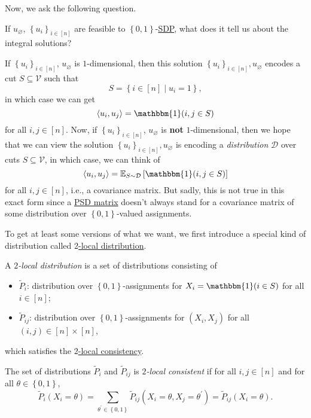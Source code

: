 Now, we ask the following question.

\begin{problem*}
	If \(u_\varnothing \), \(\left\{ u_{i}  \right\} _{i\in [n]}\) are feasible to \(\left\{ 0, 1 \right\} \)-\hyperref[def:SDP]{SDP}, what does it tell us about the integral solutions?
\end{problem*}
\begin{answer}
	If \(\left\{ u_i \right\} _{i\in [n]}\), \(u_\varnothing \) is \(1\)-dimensional, then this solution \(\left\{ u_i \right\} _{i\in [n]}, u_\varnothing\) encodes a cut \(S \subseteq \mathcal{V} \) such that
	\[
		S = \left\{ i\in [n] \mid u_i = 1 \right\},
	\]
	in which case we can get
	\[
		\left\langle u_i, u_j \right\rangle = \mathbbm{1}(i, j\in S)
	\]
	for all \(i, j\in [n]\). Now, if \(\left\{ u_i \right\} _{i\in [n]}\), \(u_\varnothing \) is \textbf{not} \(1\)-dimensional, then we hope that we can view the solution \(\left\{ u_i \right\} _{i\in [n]}, u_\varnothing \) is encoding a \emph{distribution} \(\mathcal{D} \) over cuts \(S \subseteq \mathcal{V} \), in which case, we can think of
	\[
		\left\langle u_i, u_j \right\rangle = \mathbb{E}_{S\sim \mathcal{D} }\left[ \mathbbm{1}(i, j\in S)\right]
	\]
	for all \(i, j\in [n]\), i.e., a covariance matrix. But sadly, this is not true in this exact form since a \hyperref[def:PSD]{PSD matrix} doesn't always stand for a covariance matrix of some distribution over \(\left\{ 0, 1 \right\} \)-valued assignments.
\end{answer}

To get at least some versions of what we want, we first introduce a special kind of distribution called \hyperref[def:2-local-distribution]{\(2\)-local distribution}.

\begin{definition}\label{def:2-local-distribution}
	A \emph{\(2\)-local distribution} is a set of distributions consisting of
	\begin{itemize}
		\item \(\widetilde{P} _i\): distribution over \(\left\{ 0, 1 \right\} \)-assignments for \(X_i= \mathbbm{1}(i\in S) \) for all \(i\in [n]\);
		\item \(\widetilde{P} _{ij}\): distribution over \(\left\{ 0, 1 \right\} \)-assignments for \((X_i, X_j)\) for all \((i, j)\in [n]\times [n]\),
	\end{itemize}
	which satisfies the \hyperref[def:2-local-consistency]{\(2\)-local consistency}.

	\begin{definition}\label{def:2-local-consistency}
		The set of distributions \(\widetilde{P} _i\) and \(\widetilde{P} _{ij}\) is \emph{\(2\)-local consistent} if for all \(i, j\in [n]\) and for all \(\theta \in \left\{ 0, 1 \right\} \),
		\[
			\widetilde{P} _i(X_i = \theta ) = \sum_{\theta ^\prime \in \left\{ 0, 1 \right\} } \widetilde{P} _{ij}(X_i=\theta , X_j = \theta ^\prime )= \widetilde{P} _{ij}(X_i = \theta ).
		\]
	\end{definition}

\end{definition}

